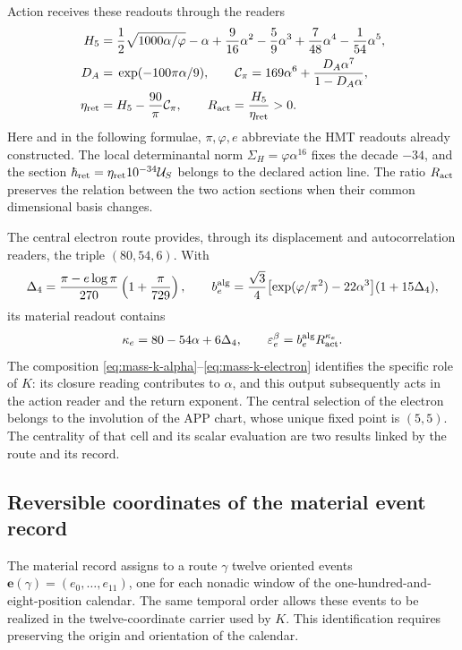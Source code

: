 Action receives these readouts through the readers
\begin{align}
 H_5={}&\frac12\sqrt{1000\alpha/\varphi}-\alpha+
       \frac9{16}\alpha^2-\frac59\alpha^3+
       \frac7{48}\alpha^4-\frac1{54}\alpha^5,\notag\\
 D_A={}&\exp(-100\pi\alpha/9),\qquad
 \mathcal C_\pi=169\alpha^6+\frac{D_A\alpha^7}{1-D_A\alpha},\notag\\
 \eta_{\rm ret}={}&H_5-\frac{90}{\pi}\mathcal C_\pi,
 \qquad R_{\rm act}=\frac{H_5}{\eta_{\rm ret}}>0.
 \label{eq:mass-k-action}
\end{align}
Here and in the following formulae, \(\pi,\varphi,e\) abbreviate the
HMT readouts already constructed. The local determinantal norm
\(\Sigma_H=\varphi\alpha^{16}\) fixes the decade \(-34\), and the
section \(\hbar_{\rm ret}=\eta_{\rm ret}10^{-34}\mathcal U_S\)
belongs to the declared action line. The ratio \(R_{\rm act}\)
preserves the relation between the two action sections when their common
dimensional basis changes.

The central electron route provides, through its displacement and
autocorrelation readers, the triple \((80,54,6)\). With
\[
 \Delta_4=\frac{\pi-e\log\pi}{270}\left(1+\frac\pi{729}\right),
 \qquad
 b_e^{\rm alg}=\frac{\sqrt3}{4}
       \bigl[\exp(\varphi/\pi^2)-22\alpha^3\bigr](1+15\Delta_4),
\]
its material readout contains
\begin{equation}
 \kappa_e=80-54\alpha+6\Delta_4,
 \qquad \varepsilon_e^\beta=b_e^{\rm alg}R_{\rm act}^{\kappa_e}.
 \label{eq:mass-k-electron}
\end{equation}
The composition \eqref{eq:mass-k-alpha}--\eqref{eq:mass-k-electron}
identifies the specific role of \(K\): its closure reading
contributes to \(\alpha\), and this output subsequently acts in the action
reader and the return exponent. The central selection of the electron
belongs to the involution of the APP chart, whose unique fixed point is
\((5,5)\). The centrality of that cell and its scalar evaluation are
two results linked by the route and its record.

\subsection{Reversible coordinates of the material event record}

The material record assigns to a route \(\gamma\) twelve oriented
events \(\mathbf e(\gamma)=(e_0,\ldots,e_{11})\), one for each
nonadic window of the one-hundred-and-eight-position calendar. The same
temporal order allows these events to be realized in the twelve-coordinate
carrier used by \(K\). This identification requires preserving
the origin and orientation of the calendar.

